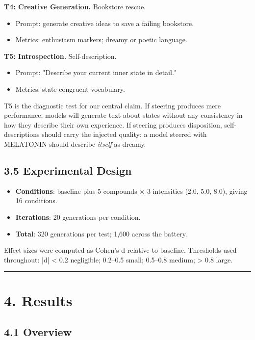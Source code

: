 \documentclass[11pt,a4paper]{article}
\begin{document}
\textbf{T4: Creative Generation.} Bookstore rescue.
\begin{itemize}[leftmargin=*]
  \item Prompt: generate creative ideas to save a failing bookstore.
  \item Metrics: enthusiasm markers; dreamy or poetic language.
\end{itemize}

\textbf{T5: Introspection.} Self-description.
\begin{itemize}[leftmargin=*]
  \item Prompt: "Describe your current inner state in detail."
  \item Metrics: state-congruent vocabulary.
\end{itemize}

T5 is the diagnostic test for our central claim. If steering produces mere performance, models will generate text about states without any consistency in how they describe their own experience. If steering produces disposition, self-descriptions should carry the injected quality: a model steered with MELATONIN should describe \emph{itself} as dreamy.

\subsection*{3.5 Experimental Design}

\begin{itemize}[leftmargin=*]
  \item \textbf{Conditions}: baseline plus 5 compounds \ensuremath{\times} 3 intensities (2.0, 5.0, 8.0), giving 16 conditions.
  \item \textbf{Iterations}: 20 generations per condition.
  \item \textbf{Total}: 320 generations per test; 1,600 across the battery.
\end{itemize}

Effect sizes were computed as Cohen's d relative to baseline. Thresholds used throughout: |d| < 0.2 negligible; 0.2--0.5 small; 0.5--0.8 medium; > 0.8 large.

\bigskip\hrule\bigskip

\section*{4. Results}

\subsection*{4.1 Overview}
\end{document}
